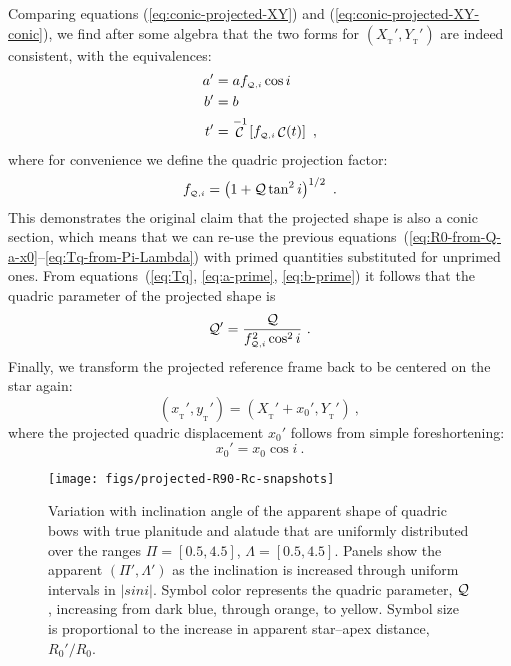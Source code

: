 \documentclass[useAMS, usenatbib, a4paper]{mnras}
\DeclareMathOperator{\Cos}{\mathcal{C}}
\providecommand{\abs}[1]{\lvert#1\rvert}
\newcommand\T{_{\mathrm{\scriptscriptstyle T}}}
\begin{document}
Comparing equations (\ref{eq:conic-projected-XY}) and
(\ref{eq:conic-projected-XY-conic}), we find after some algebra that
the two forms for \((X_{\T}', Y_{\T}')\) are indeed consistent, with
the equivalences:
%
\newcommand\fQi{\ensuremath{f_{\scriptscriptstyle \Q,i}}}
\begin{align}
  \label{eq:a-prime}
  a' &= a \fQi \cos i  \\
  \label{eq:b-prime}
  b' &= b \\
  t' &= \Cos^{-1} \left[ \fQi \Cos(t) \right]  \ ,
\end{align}
where for convenience we define the quadric projection factor:
\begin{equation}
  \label{eq:fQi-factor}
  \fQi = \left( 1 + \Q \tan^2 i \right)^{1/2} \ .
\end{equation}
This demonstrates the original claim that the projected shape is also
a conic section, which means that we can re-use the previous
equations~(\ref{eq:R0-from-Q-a-x0}--\ref{eq:Tq-from-Pi-Lambda}) with
primed quantities substituted for unprimed ones.  From
equations~(\ref{eq:Tq}, \ref{eq:a-prime}, \ref{eq:b-prime}) it follows
that the quadric parameter of the projected shape is
\begin{equation}
  \label{eq:Q-prime}
  \Q' = \frac{ \Q } { \fQi^2 \cos^2 i} \ .
\end{equation}
Finally, we transform the projected reference frame back to be
centered on the star again:
\begin{equation}
  \label{eq:XYZ-xyz-prime}
  (x_{\T}', y_{\T}') = (X_{\T}' + x_0', Y_{\T}') \ , 
\end{equation}
where the projected quadric displacement \(x_0'\) follows from simple
foreshortening:
\begin{equation}
  \label{eq:x0-prime}
  x_0' = x_0 \cos i \ .
\end{equation}


\begin{figure*}
  \centering
  \texttt{[image: figs/projected-R90-Rc-snapshots]}
  \caption[]{Variation with inclination angle of the apparent shape of
    quadric bows with true planitude and alatude that are uniformly
    distributed over the ranges \(\Pi = [0.5, 4.5]\),
    \(\Lambda = [0.5, 4.5]\).  Panels show the apparent
    \((\Pi', \Lambda')\) as the inclination is increased through uniform
    intervals in \(\abs{sin i}\).  Symbol color represents the quadric
    parameter, \(\mathcal{Q}\), increasing from dark blue, through orange, to
    yellow. Symbol size is proportional to the increase in apparent
    star--apex distance, \(R_0'/R_0\).}
  \label{fig:projected-R90-Rc-snapshots}
\end{figure*}
\end{document}
